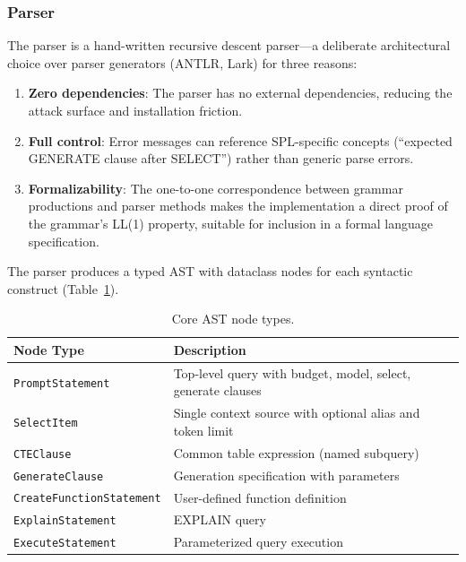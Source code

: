\documentclass[11pt,a4paper]{article}
\begin{document}
\subsubsection{Parser}

The parser is a hand-written recursive descent parser---a deliberate architectural choice over parser generators (ANTLR, Lark) for three reasons:

\begin{enumerate}[nosep]
  \item \textbf{Zero dependencies}: The parser has no external dependencies, reducing the attack surface and installation friction.
  \item \textbf{Full control}: Error messages can reference SPL-specific concepts (``expected GENERATE clause after SELECT'') rather than generic parse errors.
  \item \textbf{Formalizability}: The one-to-one correspondence between grammar productions and parser methods makes the implementation a direct proof of the grammar's LL(1) property, suitable for inclusion in a formal language specification.
\end{enumerate}

The parser produces a typed AST with dataclass nodes for each syntactic construct (Table~\ref{tab:ast-nodes}).

\begin{table}[h]
\centering
\caption{Core AST node types.}
\label{tab:ast-nodes}
\begin{tabular}{@{}lp{9cm}@{}}
\toprule
\textbf{Node Type} & \textbf{Description} \\
\midrule
\texttt{PromptStatement} & Top-level query with budget, model, select, generate clauses \\
\texttt{SelectItem} & Single context source with optional alias and token limit \\
\texttt{CTEClause} & Common table expression (named subquery) \\
\texttt{GenerateClause} & Generation specification with parameters \\
\texttt{CreateFunctionStatement} & User-defined function definition \\
\texttt{ExplainStatement} & EXPLAIN query \\
\texttt{ExecuteStatement} & Parameterized query execution \\
\bottomrule
\end{tabular}
\end{table}
\end{document}
